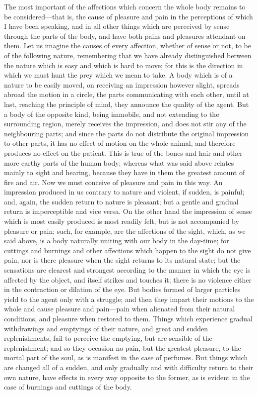 \documentclass[11pt,letter]{article}
\begin{document}
\par  The most important of the affections which concern the whole body remains to be considered—that is, the cause of pleasure and pain in the perceptions of which I have been speaking, and in all other things which are perceived by sense through the parts of the body, and have both pains and pleasures attendant on them. Let us imagine the causes of every affection, whether of sense or not, to be of the following nature, remembering that we have already distinguished between the nature which is easy and which is hard to move; for this is the direction in which we must hunt the prey which we mean to take. A body which is of a nature to be easily moved, on receiving an impression however slight, spreads abroad the motion in a circle, the parts communicating with each other, until at last, reaching the principle of mind, they announce the quality of the agent. But a body of the opposite kind, being immobile, and not extending to the surrounding region, merely receives the impression, and does not stir any of the neighbouring parts; and since the parts do not distribute the original impression to other parts, it has no effect of motion on the whole animal, and therefore produces no effect on the patient. This is true of the bones and hair and other more earthy parts of the human body; whereas what was said above relates mainly to sight and hearing, because they have in them the greatest amount of fire and air. Now we must conceive of pleasure and pain in this way. An impression produced in us contrary to nature and violent, if sudden, is painful; and, again, the sudden return to nature is pleasant; but a gentle and gradual return is imperceptible and vice versa. On the other hand the impression of sense which is most easily produced is most readily felt, but is not accompanied by pleasure or pain; such, for example, are the affections of the sight, which, as we said above, is a body naturally uniting with our body in the day-time; for cuttings and burnings and other affections which happen to the sight do not give pain, nor is there pleasure when the sight returns to its natural state; but the sensations are clearest and strongest according to the manner in which the eye is affected by the object, and itself strikes and touches it; there is no violence either in the contraction or dilation of the eye. But bodies formed of larger particles yield to the agent only with a struggle; and then they impart their motions to the whole and cause pleasure and pain—pain when alienated from their natural conditions, and pleasure when restored to them. Things which experience gradual withdrawings and emptyings of their nature, and great and sudden replenishments, fail to perceive the emptying, but are sensible of the replenishment; and so they occasion no pain, but the greatest pleasure, to the mortal part of the soul, as is manifest in the case of perfumes. But things which are changed all of a sudden, and only gradually and with difficulty return to their own nature, have effects in every way opposite to the former, as is evident in the case of burnings and cuttings of the body.
\end{document}
